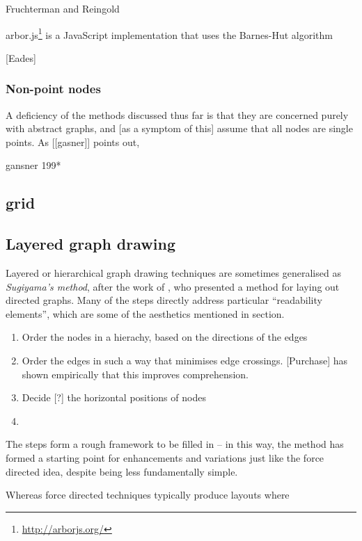 \begin{itemize*}
Fruchterman and Reingold 

arbor.js\footnote{\url{http://arborjs.org/}} is a JavaScript implementation that uses the Barnes-Hut algorithm 

[Eades]

\citet{handbook:forcedir}

\subsubsection{Non-point nodes}

A deficiency of the methods discussed thus far is that they are concerned purely with abstract graphs, and [as a symptom of this] assume that all nodes are single points. As [[gasner]] points out, 


gansner 199*




\subsection{grid}




\subsection{Layered graph drawing}

Layered or hierarchical graph drawing techniques are sometimes generalised as \emph{Sugiyama's method}, after the work of \citet{4308636}, who presented a method for laying out directed graphs. Many of the steps directly address particular ``readability elements'', which are some of the aesthetics mentioned in section.

\begin{enumerate}
\item Order the nodes in a hierachy, based on the directions of the edges
\item Order the edges in such a way that minimises edge crossings. [Purchase] has shown empirically that this improves comprehension.
\item Decide [?] the horizontal positions of nodes
\item
\end{enumerate}

The steps form a rough framework to be filled in -- in this way, the method has formed a starting point for enhancements and variations just like the force directed idea, despite being less fundamentally simple.

Whereas force directed techniques typically produce layouts where 



\end{itemize*}
